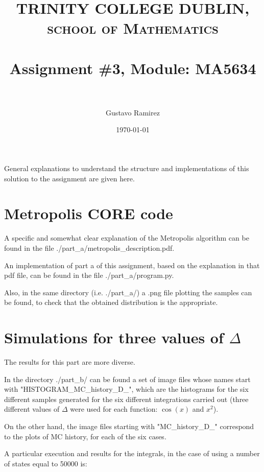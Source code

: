 \documentclass[paper=a4, fontsize=11pt]{scrartcl} %
\title{	
\normalfont \normalsize 
\textsc{TRINITY COLLEGE DUBLIN, school of Mathematics} \\ [25pt] %
\horrule{0.5pt} \\[0.4cm] %
\huge Assignment \#3, Module: MA5634 \\ %
\horrule{2pt} \\[0.5cm] %
}
\author{Gustavo Ramirez} %
\date{\normalsize\today} %
\numberwithin{equation}{section} %
\numberwithin{figure}{section} %
\numberwithin{table}{section} %
\begin{document}
\maketitle %



General explanations to understand the structure and implementations of this solution to the assignment are given here.


\newpage




\section{Metropolis CORE code}

A specific and somewhat clear explanation of the Metropolis algorithm can be found in the file ./part\_a/metropolis\_description.pdf.

An implementation of part a of this assignment, based on the explanation in that pdf file, can be found in the file ./part\_a/program.py.

Also, in the same directory (i.e. ./part\_a/) a .png file plotting the samples can be found, to check that the obtained distribution is the appropriate.



\section{Simulations for three values of $\Delta$}

The results for this part are more diverse.

In the directory ./part\_b/ can be found a set of image files whose names start with "HISTOGRAM\_MC\_history\_D\_", which are the histograms for the six different samples generated for the six different integrations carried out (three different values of $\Delta$ were used for each function: $\cos(x)$ and $x^{2}$).

On the other hand, the image files starting with "MC\_history\_D\_" correspond to the plots of MC history, for each of the six cases.

A particular execution and results for the integrals, in the case of using a number of states equal to 50000 is:

\ \\
\end{document}
